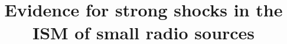 \documentclass[linenumbers,trackchanges]{aastex701}
\begin{document}
\title{Evidence for strong shocks in the ISM of small radio sources}


\end{document}

